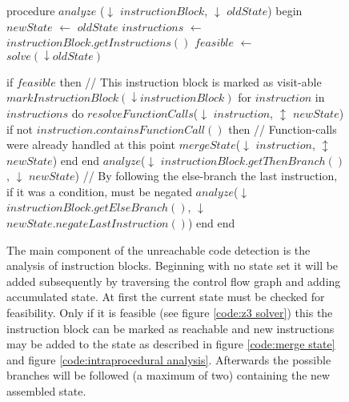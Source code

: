 \begin{figure}[h!]
	\begin{GenericCode}
	procedure $analyze$ ($\downarrow$ $instructionBlock$, $\downarrow$ $oldState$) begin
		$newState$ $\leftarrow$ $oldState$
		$instructions$ $\leftarrow$ $instructionBlock.getInstructions()$
		$feasible$ $\leftarrow$ $solve(\downarrow oldState)$
		
		if $feasible$ then
			// This instruction block is marked as visit-able
			$markInstructionBlock(\downarrow instructionBlock)$ 
			for $instruction$ in $instructions$ do
				$resolveFunctionCalls$($\downarrow$ $instruction$, $\updownarrow$ $newState$)	
				if not $instruction.containsFunctionCall()$ then
					// Function-calls were already handled at this point
					$mergeState$($\downarrow$ $instruction$, $\updownarrow$ $newState$)
				end 
			end
			$analyze$($\downarrow$ $instructionBlock.getThenBranch()$, $\downarrow$ $newState$)
			// By following the else-branch the last instruction, if it was a condition, must be negated
			$analyze$($\downarrow$ $instructionBlock.getElseBranch()$, $\downarrow$ $newState.negateLastInstruction()$)
		end
	end	
	\end{GenericCode}

	\caption{The main component of the unreachable code detection is the analysis of instruction blocks. Beginning with no state set it will be added subsequently by traversing the control flow graph and adding accumulated state. 
	At first the current state must be checked for feasibility. Only if it is feasible (see figure \ref{code:z3 solver}) this the instruction block can be marked as reachable and new instructions may be added to the state as described in figure \ref{code:merge state} and figure \ref{code:intraprocedural analysis}.	
	Afterwards the possible branches will be followed (a maximum of two) containing the new assembled state.}
	\label{code:instruction block analyzer}
\end{figure}

